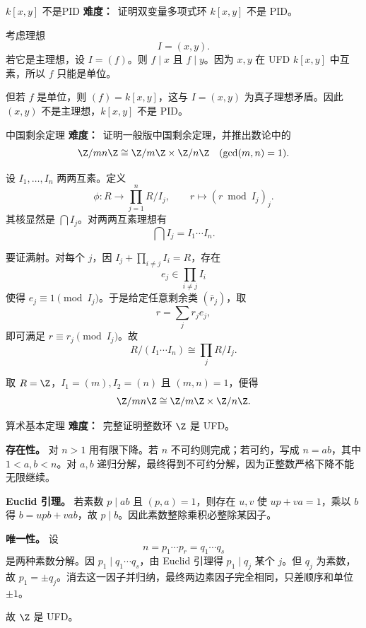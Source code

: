 \begin{problem}{$k[x,y]$ 不是PID}
\textbf{难度：}\hard\ 证明双变量多项式环 $k[x,y]$ 不是 PID。
\end{problem}
\begin{solution}
考虑理想
\[
I=(x,y).
\]
若它是主理想，设 $I=(f)$。则 $f\mid x$ 且 $f\mid y$。因为 $x,y$ 在 UFD $k[x,y]$ 中互素，所以 $f$ 只能是单位。

但若 $f$ 是单位，则 $(f)=k[x,y]$，这与 $I=(x,y)$ 为真子理想矛盾。因此 $(x,y)$ 不是主理想，$k[x,y]$ 不是 PID。
\end{solution}

\begin{problem}{中国剩余定理}
\textbf{难度：}\hard\ 证明一般版中国剩余定理，并推出数论中的
\[
\Z/mn\Z\cong\Z/m\Z\times\Z/n\Z\quad (\gcd(m,n)=1).
\]
\end{problem}
\begin{solution}
设 $I_1,\dots,I_n$ 两两互素。定义
\[
\phi:R\to \prod_{j=1}^n R/I_j,
\qquad
r\mapsto (r\bmod I_j)_j.
\]
其核显然是 $\bigcap I_j$。对两两互素理想有
\[
\bigcap I_j=I_1\cdots I_n.
\]

要证满射。对每个 $j$，因 $I_j+\prod_{i\ne j}I_i=R$，存在
\[
e_j\in \prod_{i\ne j}I_i
\]
使得 $e_j\equiv1\pmod{I_j}$。于是给定任意剩余类 $(\bar r_j)$，取
\[
r=\sum_j r_je_j,
\]
即可满足 $r\equiv r_j\pmod{I_j}$。故
\[
R/(I_1\cdots I_n)\cong \prod_j R/I_j.
\]

取 $R=\Z$，$I_1=(m),I_2=(n)$ 且 $(m,n)=1$，便得
\[
\Z/mn\Z\cong \Z/m\Z\times\Z/n\Z.
\]
\end{solution}

\begin{problem}{算术基本定理}
\textbf{难度：}\hard\ 完整证明整数环 $\Z$ 是 UFD。
\end{problem}
\begin{solution}
\textbf{存在性。} 对 $n>1$ 用有限下降。若 $n$ 不可约则完成；若可约，写成 $n=ab$，其中 $1<a,b<n$。对 $a,b$ 递归分解，最终得到不可约分解，因为正整数严格下降不能无限继续。

\textbf{Euclid 引理。} 若素数 $p\mid ab$ 且 $(p,a)=1$，则存在 $u,v$ 使 $up+va=1$，乘以 $b$ 得 $b=upb+vab$，故 $p\mid b$。因此素数整除乘积必整除某因子。

\textbf{唯一性。} 设
\[
n=p_1\cdots p_r=q_1\cdots q_s
\]
是两种素数分解。因 $p_1\mid q_1\cdots q_s$，由 Euclid 引理得 $p_1\mid q_j$ 某个 $j$。但 $q_j$ 为素数，故 $p_1=\pm q_j$。消去这一因子并归纳，最终两边素因子完全相同，只差顺序和单位 $\pm1$。

故 $\Z$ 是 UFD。
\end{solution}

